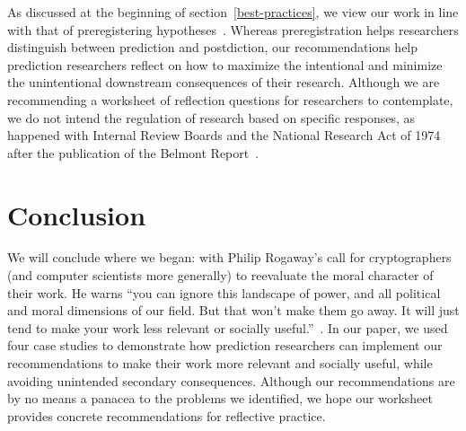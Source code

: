 \documentclass[12pt]{article}
\begin{document}
    As discussed at the beginning of section~\ref{best-practices}, we view our work in line with that of preregistering hypotheses~\cite{preregister}. Whereas preregistration helps researchers distinguish between prediction and postdiction, our recommendations help prediction researchers reflect on how to maximize the intentional and minimize the unintentional downstream consequences of their research. Although we are recommending a worksheet of reflection questions for researchers to contemplate, we do not intend the regulation of research based on specific responses, as happened with Internal Review Boards and the National Research Act of 1974 after the publication of the Belmont Report~\cite{belmont}. 


\section{Conclusion}
    
    We will conclude where we began: with Philip Rogaway's call for cryptographers (and computer scientists more generally) to reevaluate the moral character of their work. He warns ``you can ignore this landscape of power, and all political and moral dimensions of our field. But that won’t make them go away. It will just tend to make your work less relevant or socially useful.''~\cite{crypto}. In our paper, we used four case studies to demonstrate how prediction researchers can implement our recommendations to make their work more relevant and socially useful, while avoiding unintended secondary consequences. Although our recommendations are by no means a panacea to the problems we identified, we hope our worksheet provides concrete recommendations for reflective practice.  

  

\end{document}
